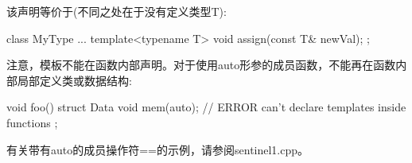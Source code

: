 该声明等价于(不同之处在于没有定义类型T):

\begin{cpp}
class MyType {
	...
	template<typename T>
	void assign(const T& newVal);
};
\end{cpp}

注意，模板不能在函数内部声明。对于使用auto形参的成员函数，不能再在函数内部局部定义类或数据结构:

\begin{cpp}
void foo()
{
	struct Data {
		void mem(auto); // ERROR can’t declare templates inside functions
	};
}
\end{cpp}

有关带有auto的成员操作符==的示例，请参阅sentinel1.cpp。
